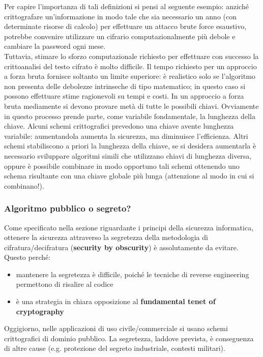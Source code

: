 Per capire l'importanza di tali definizioni si pensi al seguente esempio: anziché crittografare un'informazione in modo tale che sia necessario un anno (con determinate risorse di calcolo) per effettuare un attacco brute force esaustivo, potrebbe convenire utilizzare un cifrario computazionalmente più debole e cambiare la password ogni mese. \\

Tuttavia, stimare lo sforzo computazionale richiesto per effettuare con successo la crittoanalisi del testo cifrato è molto difficile. Il tempo richiesto per un approccio a forza bruta fornisce soltanto un limite superiore: è realistico solo se l'algoritmo non presenta delle debolezze intrinseche di tipo matematico; in questo caso si possono effettuare stime ragionevoli su tempi e costi. In un approccio a forza bruta mediamente si devono provare metà di tutte le possibili chiavi. Ovviamente in questo processo prende parte, come variabile fondamentale, la lunghezza della chiave. Alcuni schemi crittografici prevedono una chiave avente lunghezza variabile: aumentandola aumenta la sicurezza, ma diminuisce l'efficienza. Altri schemi stabiliscono a priori la lunghezza della chiave, se si desidera aumentarla è necessario sviluppare algoritmi simili che utilizzano chiavi di lunghezza diversa, oppure è possibile combinare in modo opportuno tali schemi ottenendo uno schema risultante con una chiave globale più lunga (attenzione al modo in cui si combinano!).

\subsubsection{Algoritmo pubblico o segreto?}
Come specificato nella sezione riguardante i principi della sicurezza informatica, ottenere la sicurezza attraverso la segretezza della metodologia di cifratura/decifratura (\textbf{security by obscurity}) è assolutamente da evitare. Questo perché:
\begin{itemize} 
  \item mantenere la segretezza è difficile, poiché le tecniche di reverse engineering permettono di risalire al codice
  \item è una strategia in chiara opposizione al \textbf{fundamental tenet of cryptography}
\end{itemize}
Oggigiorno, nelle applicazioni di uso civile/commerciale si usano schemi crittografici di dominio pubblico. La segretezza, laddove prevista, è conseguenza di altre cause (e.g. protezione del segreto industriale, contesti militari).

